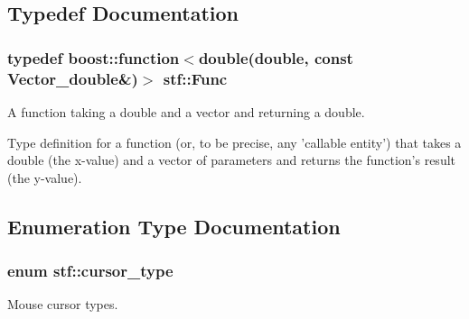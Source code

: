 \subsection{Typedef Documentation}
\hypertarget{group__stfgen_ga11d6ec55abceacf5fdd47f9fc889d9a3}{
\subsubsection[{Func}]{\setlength{\rightskip}{0pt plus 5cm}typedef boost::function$<$double(double, const Vector\_\-double\&)$>$ {\bf stf::Func}}}
\label{group__stfgen_ga11d6ec55abceacf5fdd47f9fc889d9a3}


A function taking a double and a vector and returning a double. 

Type definition for a function (or, to be precise, any 'callable entity') that takes a double (the x-\/value) and a vector of parameters and returns the function's result (the y-\/value). 

\subsection{Enumeration Type Documentation}
\hypertarget{group__stfgen_gad2d1acb3ac0c16ee32b5f4d3a1ab4abf}{
\subsubsection[{cursor\_\-type}]{\setlength{\rightskip}{0pt plus 5cm}enum {\bf stf::cursor\_\-type}}}
\label{group__stfgen_gad2d1acb3ac0c16ee32b5f4d3a1ab4abf}


Mouse cursor types. 

